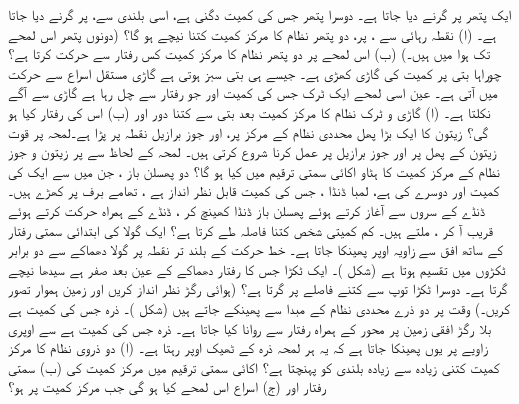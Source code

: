 ایک پتھر  پر گرنے دیا جاتا ہے۔ دوسرا پتھر جس کی کمیت دگنی ہے، اسی بلندی سے،  پر گرنے دیا جاتا ہے۔ (ا) نقطہ رہائی سے ،   پر،   دو پتھر نظام کا مرکز کمیت  کتنا نیچے ہو گا؟ (دونوں پتھر اس لمحے تک ہوا میں ہیں۔) (ب)  اس لمحے پر دو پتھر نظام کا مرکز کمیت کس رفتار سے حرکت کرتا ہے؟
چوراہا بتی پر  کمیت کی  گاڑی  کھڑی ہے۔ جیسے ہی بتی سبز ہوتی ہے گاڑی   مستقل اسراع سے  حرکت میں آتی ہے۔ عین اسی لمحے ایک ٹرک جس کی کمیت  اور جو  رفتار سے چل رہا ہے گاڑی سے آگے نکلتا ہے۔ (ا) گاڑی و ٹرک نظام کا مرکز کمیت  بعد  بتی سے کتنا دور اور (ب) اس کی  رفتار  کیا ہو گی؟
زیتون  کا ایک بڑا پھل        محددی نظام کے  مرکز پر، اور  جوز برازیل    نقطہ
   پر پڑا ہے۔لمحہ  پر قوت  زیتون کے پھل  پر اور  جوز برازیل  پر  عمل کرنا  شروع کرتی ہیں۔ لمحہ  کے لحاظ سے  پر  زیتون و جوز نظام کے  مرکز کمیت  کا  ہٹاو  اکائی سمتی ترقیم میں کیا ہو گا؟
دو  پھسلن باز ، جن میں سے ایک کی کمیت  اور دوسرے کی  ہے،  لمبا ڈنڈا ، جس کی کمیت قابل نظر انداز ہے  ، تھامے  برف پر  کھڑے ہیں۔ ڈنڈے کے  سروں سے آغاز کرتے ہوئے پھسلن باز ڈنڈا کھینچ کر ، ڈنڈے کے ہمراہ حرکت  کرتے ہوئے  قریب آ کر ، ملتے ہیں۔  کم کمیتی شخص کتنا فاصلہ طے کرتا ہے؟
ایک گولا   کی ابتدائی   سمتی رفتار    کے ساتھ افق سے   زاویہ  اوپر پھینکا جاتا ہے۔ خط حرکت کے   بلند تر نقطہ پر  گولا دھماکے سے دو برابر  ٹکڑوں میں تقسیم ہوتا ہے (شکل )۔ ایک ٹکڑا جس کا رفتار دھماکے کے عین بعد صفر ہے سیدھا نیچے گرتا ہے۔ دوسرا ٹکڑا  توپ سے  کتنے فاصلے پر گرتا ہے؟ (ہوائی رگڑ نظر انداز کریں اور زمین  ہموار تصور کریں۔)
وقت  پر دو ذرے محددی نظام کے مبدا سے  پھینکے  جاتے ہیں (شکل )۔ ذرہ  جس کی کمیت  ہے بلا رگڑ  افقی زمین  پر محور  کے ہمراہ  رفتار سے   روانا  کیا جاتا ہے۔  ذرہ  جس کی کمیت  ہے  سے  اوپری زاویے پر یوں پھینکا جاتا ہے کہ  یہ ہر لمحہ ذرہ کے ٹھیک  اوپر  رہتا ہے۔ (ا) دو ذروی نظام کا مرکز کمیت  کتنی زیادہ سے زیادہ بلندی  کو پہنچتا ہے؟ اکائی سمتی ترقیم میں  مرکز کمیت کی (ب) سمتی رفتار اور (ج) اسراع اس لمحے کیا ہو گی جب مرکز کمیت   پر  ہو؟
